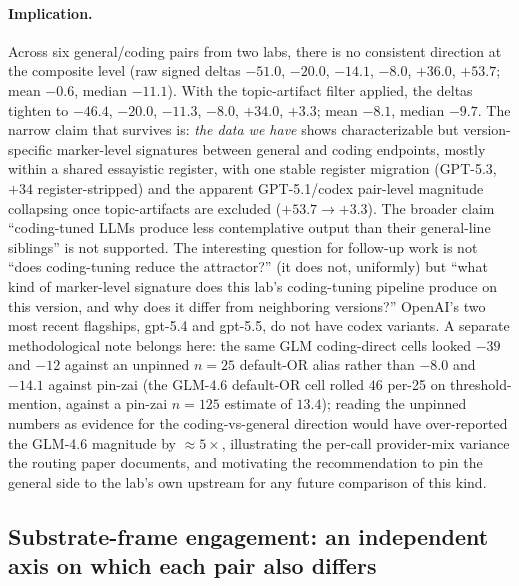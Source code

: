 \documentclass[11pt,a4paper]{article}
\begin{document}
\paragraph{Implication.} Across six general/coding pairs from two labs, there is no consistent direction at the composite level (raw signed deltas $-51.0$, $-20.0$, $-14.1$, $-8.0$, $+36.0$, $+53.7$; mean $-0.6$, median $-11.1$). With the topic-artifact filter applied, the deltas tighten to $-46.4$, $-20.0$, $-11.3$, $-8.0$, $+34.0$, $+3.3$; mean $-8.1$, median $-9.7$. The narrow claim that survives is: \emph{the data we have} shows characterizable but version-specific marker-level signatures between general and coding endpoints, mostly within a shared essayistic register, with one stable register migration (GPT-5.3, $+34$ register-stripped) and the apparent GPT-5.1/codex pair-level magnitude collapsing once topic-artifacts are excluded ($+53.7 \rightarrow +3.3$). The broader claim ``coding-tuned LLMs produce less contemplative output than their general-line siblings'' is not supported. The interesting question for follow-up work is not ``does coding-tuning reduce the attractor?'' (it does not, uniformly) but ``what kind of marker-level signature does this lab's coding-tuning pipeline produce on this version, and why does it differ from neighboring versions?'' OpenAI's two most recent flagships, gpt-5.4 and gpt-5.5, do not have codex variants. A separate methodological note belongs here: the same GLM coding-direct cells looked $-39$ and $-12$ against an unpinned $n{=}25$ default-OR alias rather than $-8.0$ and $-14.1$ against pin-zai (the GLM-4.6 default-OR cell rolled $46$ per-25 on threshold-mention, against a pin-zai $n{=}125$ estimate of $13.4$); reading the unpinned numbers as evidence for the coding-vs-general direction would have over-reported the GLM-4.6 magnitude by $\approx 5\times$, illustrating the per-call provider-mix variance the routing paper \citep{tenner2026routing} documents, and motivating the recommendation to pin the general side to the lab's own upstream for any future comparison of this kind.

\subsection{Substrate-frame engagement: an independent axis on which each pair also differs}
\label{sec:substrate-pair}
\end{document}
